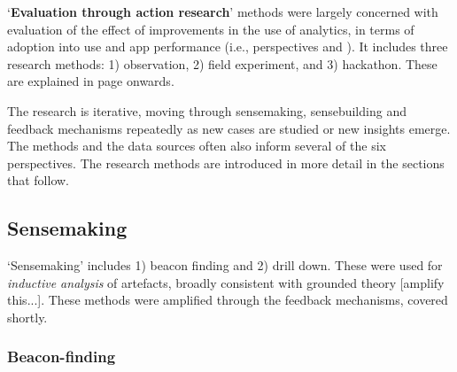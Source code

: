 `\textbf{Evaluation through action research}' methods were largely concerned with evaluation of the effect of improvements in the use of analytics, in terms of adoption into use and app performance (i.e., perspectives \iuse and \iartefacts). It includes three research methods: 1) observation, 2) field experiment, and 3) hackathon. These are explained in page \pageref{section-evaluation-through-action-research-method} onwards. 

The research is iterative, moving through sensemaking, sensebuilding and feedback mechanisms repeatedly as new cases are studied or new insights emerge.  The methods and the data sources often also inform several of the six perspectives.  The research methods are introduced in more detail in the sections that follow.

\subsection{Sensemaking}

`Sensemaking' includes 1) beacon finding and 2) drill down. These were used for \textit{inductive analysis} of artefacts, broadly consistent with grounded theory [amplify this...].  These methods were amplified through the feedback mechanisms, covered shortly. 



\subsubsection{Beacon-finding}~\label{section-beacon-finding-method} %

